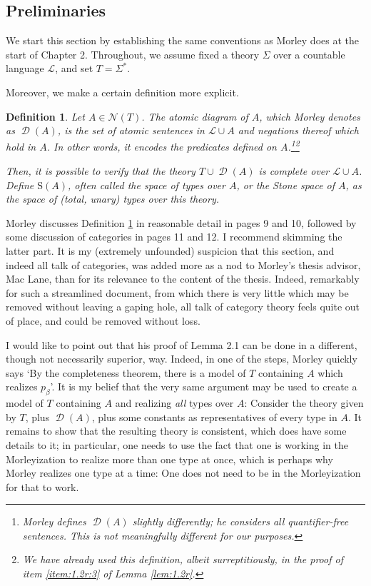 \documentclass{article}
\newtheorem{definition}[theorem]{Definition}
\theoremstyle{nonumberplain}
\newcommand{\Lang}{\mathcal{L}}
\newcommand{\calN}{\mathcal{N}}
\newcommand{\Stone}{\mathrm{S}}
\DeclareMathOperator{\ADG}{\mathcal{D}}
\begin{document}
\subsection{Preliminaries}

We start this section by establishing the same conventions as Morley does at the start of Chapter 2. Throughout, we assume fixed a theory $\Sigma$ over a countable language $\Lang$, and set $T = \Sigma^*$.

Moreover, we make a certain definition more explicit.

\begin{definition}\label{def:stonespace}
Let $A \in \calN(T)$. The \emph{atomic diagram of $A$}, which Morley denotes as $\ADG(A)$, is the set of atomic sentences in $\Lang \cup A$ and negations thereof which hold in $A$. In other words, it encodes the predicates defined on $A$.\footnote{Morley defines $\ADG(A)$ slightly differently; he considers all quantifier-free sentences. This is not meaningfully different for our purposes.}\footnote{We have already used this definition, albeit surreptitiously, in the proof of item \ref{item:1.2r:3} of Lemma \ref{lem:1.2r}.}

Then, it is possible to verify that the theory $T \cup \ADG(A)$ is complete over $\Lang \cup A$. Define $\Stone(A)$, often called the space of \emph{types over $A$}, or the \emph{Stone space of $A$}, as the space of (total, unary) types over this theory.
\end{definition}

Morley discusses Definition \ref{def:stonespace} in reasonable detail in pages 9 and 10, followed by some discussion of categories in pages 11 and 12. I recommend skimming the latter part. It is my (extremely unfounded) suspicion that this section, and indeed all talk of categories, was added more as a nod to Morley's thesis advisor, Mac Lane, than for its relevance to the content of the thesis. Indeed, remarkably for such a streamlined document, from which there is very little which may be removed without leaving a gaping hole, all talk of category theory feels quite out of place, and could be removed without loss.

I would like to point out that his proof of Lemma 2.1 can be done in a different, though not necessarily superior, way. Indeed, in one of the steps, Morley quickly says `By the completeness theorem, there is a model of $T$ containing $A$ which realizes $p_\beta$'. It is my belief that the very same argument may be used to create a model of $T$ containing $A$ and realizing \emph{all} types over $A$: Consider the theory given by $T$, plus $\ADG(A)$, plus some constants as representatives of every type in $A$. It remains to show that the resulting theory is consistent, which does have some details to it; in particular, one needs to use the fact that one is working in the Morleyization to realize more than one type at once, which is perhaps why Morley realizes one type at a time: One does not need to be in the Morleyization for that to work.
\end{document}
